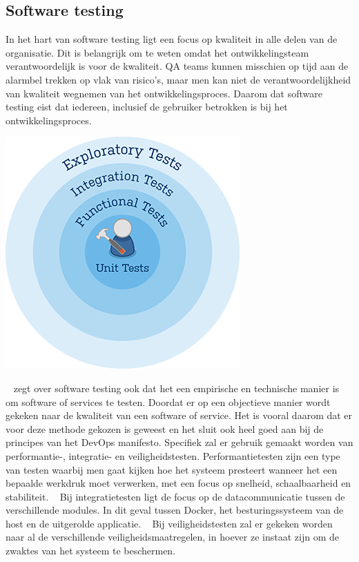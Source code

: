 
\subsection{Software testing}
\label{sec:testing-uitleg}
In het hart van software testing ligt een focus op kwaliteit in alle delen van de organisatie. Dit is belangrijk om te weten omdat het ontwikkelingsteam verantwoordelijk is voor de kwaliteit. QA teams kunnen misschien op tijd aan de alarmbel trekken op vlak van risico's, maar men kan niet de verantwoordelijkheid van kwaliteit wegnemen van het ontwikkelingsproces. Daarom dat software testing eist dat iedereen, inclusief de gebruiker betrokken is bij het ontwikkelingsproces. ~\autocite{SoftwareTesting}

\begin{center}
	\includegraphics[scale=0.5]{img/testing.png}
\end{center}

~\textcite{CemKaner2006} zegt over software testing ook dat het een empirische en technische manier is om software of services te testen. Doordat er op een objectieve manier wordt gekeken naar de kwaliteit van een software of service. Het is vooral daarom dat er voor deze methode gekozen is geweest en het sluit ook heel goed aan bij de principes van het DevOps manifesto.
Specifiek zal er gebruik gemaakt worden van performantie-, integratie- en veiligheidstesten.
Performantietesten zijn een type van testen waarbij men gaat kijken hoe het systeem presteert wanneer het een bepaalde werkdruk moet verwerken, met een focus op snelheid, schaalbaarheid en stabiliteit. ~\autocite{PerformanceTesting}
Bij integratietesten ligt de focus op de datacommunicatie tussen de verschillende modules. In dit geval tussen Docker, het besturingssysteem van de host en de uitgerolde applicatie. ~\autocite{IntegrationTesting}
Bij veiligheidstesten zal er gekeken worden naar al de verschillende veiligheidsmaatregelen, in hoever ze instaat zijn om de zwaktes van het systeem te beschermen. ~\autocite{SecurityTesting}

